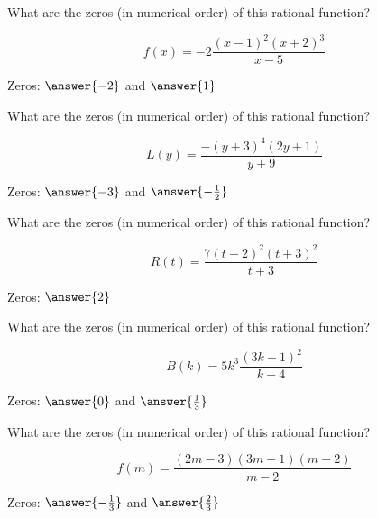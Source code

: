\documentclass{ximera}
\author{Lee Wayand}
\begin{document}
\begin{exercise}








\begin{question}


What are the zeros (in numerical order) of this rational function?

\[
f(x) = -2\frac{(x-1)^2(x+2)^3}{x-5}
\]


Zeros:  $\answer{-2}$ and $\answer{1}$

\end{question}





\begin{question}


What are the zeros (in numerical order) of this rational function?

\[
L(y) = \frac{-(y+3)^4(2y+1)}{y+9}
\]

Zeros:  $\answer{-3}$ and $\answer{-\frac{1}{2}}$

\end{question}





\begin{question}


What are the zeros (in numerical order) of this rational function?

\[
R(t) = \frac{7(t-2)^2(t+3)^2}{t+3}
\]

Zeros:  $\answer{2}$

\end{question}





\begin{question}


What are the zeros (in numerical order) of this rational function?

\[
B(k) =  5k^3 \frac{(3k - 1)^2}{k+4}
\]

Zeros:  $\answer{0}$ and $\answer{\frac{1}{3}}$

\end{question}








\begin{question}


What are the zeros (in numerical order) of this rational function?

\[
f(m) = \frac{(2m - 3)(3m + 1)(m-2)}{m-2}
\]

Zeros:  $\answer{-\frac{1}{3}}$ and $\answer{\frac{2}{3}}$

\end{question}












\end{exercise}
\end{document}
